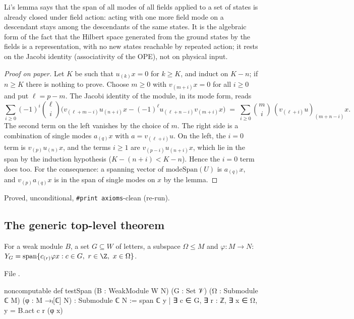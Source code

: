 \begin{physics}
Li's lemma says that the span of all modes of all fields applied to a set of states is already closed under field action: acting with one more field mode on a descendant stays among the descendants of the same states. It is the algebraic form of the fact that the Hilbert space generated from the ground states by the fields is a representation, with no new states reachable by repeated action; it rests on the Jacobi identity (associativity of the OPE), not on physical input.
\end{physics}
\begin{proof}[Proof on paper]
Let $K$ be such that $u_{(k)}x=0$ for $k\ge K$, and induct on $K-n$; if $n\ge K$ there is nothing
to prove.  Choose $m\ge0$ with $v_{(m+i)}x=0$ for all $i\ge0$ and put $\ell=p-m$.  The Jacobi
identity of the module, in its mode form, reads
\begin{equation*}
 \sum_{i\ge0}(-1)^i\binom{\ell}{i}\Big(v_{(\ell+m-i)}u_{(n+i)}x - (-1)^\ell u_{(\ell+n-i)}v_{(m+i)}x\Big)
 \;=\;\sum_{i\ge0}\binom{m}{i}\,(v_{(\ell+i)}u)_{(m+n-i)}x .
\end{equation*}
The second term on the left vanishes by the choice of $m$.  The right side is a combination of single
modes $a_{(q)}x$ with $a=v_{(\ell+i)}u$.  On the left, the $i=0$ term is $v_{(p)}u_{(n)}x$, and the terms
$i\ge1$ are $v_{(p-i)}u_{(n+i)}x$, which lie in the span by the induction hypothesis ($K-(n+i)<K-n$).
Hence the $i=0$ term does too.  For the consequence: a spanning vector of $\mathrm{modeSpan}(U)$ is
$a_{(q)}x$, and $v_{(p)}a_{(q)}x$ is in the span of single modes on $x$ by the lemma.
\end{proof}
\begin{status}Proved, unconditional, \texttt{\#print axioms}-clean (re-run).\end{status}

\subsection{The generic top-level theorem}

\begin{definition}\label{ch12:def:testspan}
For a weak module $B$, a set $G\subseteq W$ of letters, a subspace $\Omega\le M$ and $\varphi:M\to N$:
$Y_G=\operatorname{span}\{c_{(r)}\varphi x : c\in G,\ r\in\Z,\ x\in\Omega\}$.
\end{definition}
File .
\begin{leancode}
noncomputable def testSpan (B : WeakModule W N) (G : Set 𝒱) (Ω : Submodule ℂ M)
    (φ : M →ₗ[ℂ] N) : Submodule ℂ N :=
  span ℂ {y | ∃ c ∈ G, ∃ r : ℤ, ∃ x ∈ Ω, y = B.act c r (φ x)}
\end{leancode}

